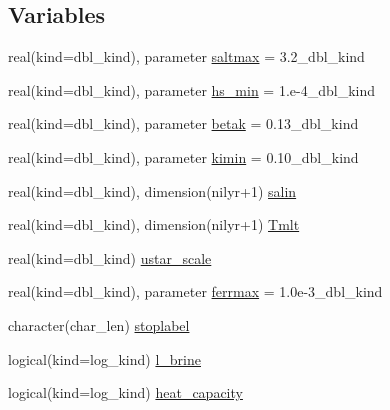 \subsection*{Variables}
\begin{DoxyCompactItemize}
\item 
real(kind=dbl\_\-kind), parameter \hyperlink{namespaceice__therm__vertical_abca199468a09d7af2a96e7ceb456b8c4}{saltmax} = 3.2\_\-dbl\_\-kind
\item 
real(kind=dbl\_\-kind), parameter \hyperlink{namespaceice__therm__vertical_af7421836575fc4323bfe4b53fbc5f1ac}{hs\_\-min} = 1.e-\/4\_\-dbl\_\-kind
\item 
real(kind=dbl\_\-kind), parameter \hyperlink{namespaceice__therm__vertical_a5d1e969b838504de79a78a45daba6424}{betak} = 0.13\_\-dbl\_\-kind
\item 
real(kind=dbl\_\-kind), parameter \hyperlink{namespaceice__therm__vertical_ac9c4fb671c6d11d24a29369d6c7410fa}{kimin} = 0.10\_\-dbl\_\-kind
\item 
real(kind=dbl\_\-kind), dimension(nilyr+1) \hyperlink{namespaceice__therm__vertical_a484442c434b314140ae3763d41fc9075}{salin}
\item 
real(kind=dbl\_\-kind), dimension(nilyr+1) \hyperlink{namespaceice__therm__vertical_a25807d5de9fde0e10364d63e32691919}{Tmlt}
\item 
real(kind=dbl\_\-kind) \hyperlink{namespaceice__therm__vertical_a95faafaf9b21d14aa8dcf5fd91e50cac}{ustar\_\-scale}
\item 
real(kind=dbl\_\-kind), parameter \hyperlink{namespaceice__therm__vertical_a0721a294c629506af790049e6d607d53}{ferrmax} = 1.0e-\/3\_\-dbl\_\-kind
\item 
character(char\_\-len) \hyperlink{namespaceice__therm__vertical_a11814e124127a01f102f5b38e9ede650}{stoplabel}
\item 
logical(kind=log\_\-kind) \hyperlink{namespaceice__therm__vertical_aeb4df87d7011ce33c626c76f6a0dc063}{l\_\-brine}
\item 
logical(kind=log\_\-kind) \hyperlink{namespaceice__therm__vertical_a533694de6308b9a0b8839ba5dacc54af}{heat\_\-capacity}
\end{DoxyCompactItemize}


